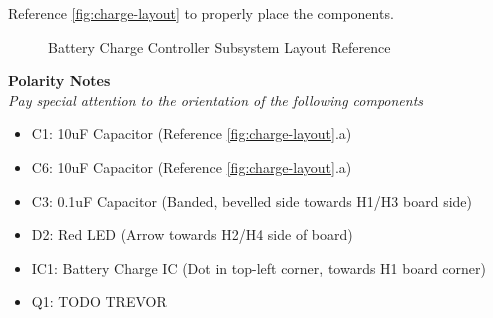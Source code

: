 \documentclass{article}
\begin{document}
Reference \autoref{fig:charge-layout} to properly place the components.

\begin{figure}[H]
    \centering
        \qquad
        \caption{Battery Charge Controller Subsystem Layout Reference}%
    \label{fig:charge-layout}%
\end{figure}

\noindent \textbf{Polarity Notes}\\
\noindent \textit{Pay special attention to the orientation of the following components}
\begin{itemize}
  \item C1: 10uF Capacitor (Reference \autoref{fig:charge-layout}.a)
  \item C6: 10uF Capacitor (Reference \autoref{fig:charge-layout}.a)
  \item C3: 0.1uF Capacitor  (Banded, bevelled side towards H1/H3 board side)
  \item D2: Red LED (Arrow towards H2/H4 side of board)
  \item IC1: Battery Charge IC (Dot in top-left corner, towards H1 board corner)
  \item Q1: TODO TREVOR
\end{itemize}
\end{document}
